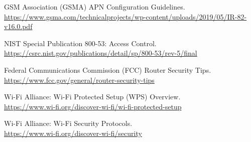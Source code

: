 \documentclass[11pt]{article}
\begin{document}
\clearpage

\begin{thebibliography}{99}
      GSM Association (GSMA) APN Configuration Guidelines. \\
      \url{https://www.gsma.com/technicalprojects/wp-content/uploads/2019/05/IR-82-v16.0.pdf}
  
      NIST Special Publication 800-53: Access Control. \\
      \url{https://csrc.nist.gov/publications/detail/sp/800-53/rev-5/final}
  
      Federal Communications Commission (FCC) Router Security Tips. \\
      \url{https://www.fcc.gov/general/router-security-tips}
  
      Wi-Fi Alliance: Wi-Fi Protected Setup (WPS) Overview. \\
      \url{https://www.wi-fi.org/discover-wi-fi/wi-fi-protected-setup}
  
      Wi-Fi Alliance: Wi-Fi Security Protocols. \\
      \url{https://www.wi-fi.org/discover-wi-fi/security}
  \end{thebibliography}
\end{document}
